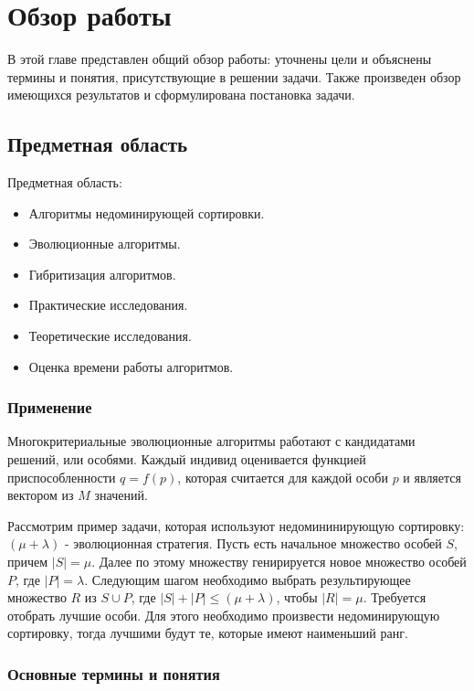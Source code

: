 
\chapter{Обзор работы}
\label{chapter1}

В этой главе представлен общий обзор работы: уточнены цели и объяснены термины и понятия, присутствующие в решении задачи. Также произведен обзор имеющихся результатов и сформулирована постановка задачи.

\section{Предметная область}
Предметная область:

\begin{itemize}
\item Алгоритмы недоминирующей сортировки.
\item Эволюционные алгоритмы.
\item Гибритизация алгоритмов.
\item Практические исследования.
\item Теоретические исследования.
\item Оценка времени работы алгоритмов.
\end{itemize}

\subsection{Применение}
Многокритериальные эволюционные алгоритмы работают с кандидатами решений, или особями. Каждый индивид оценивается функцией приспособленности $q=f(p)$, которая считается для каждой особи $p$ и является вектором из $M$ значений. 

Рассмотрим пример задачи, которая используют недомининирующую сортировку: $(\mu + \lambda)$ - эволюционная стратегия. Пусть есть начальное множество особей $S$, причем $|S| = \mu$. Далее по этому множеству генирируется новое множество особей $P$, где  $|P| = \lambda$. Следующим шагом необходимо выбрать результирующее множество $R$ из $S \cup P$, где $|S|+|P| \leq (\mu + \lambda)$, чтобы $|R|= \mu$. Требуется отобрать лучшие особи. Для этого необходимо произвести недоминирующую сортировку, тогда лучшими будут те, которые имеют наименьший ранг.

\subsection{Основные термины и понятия}

